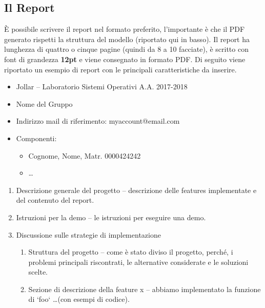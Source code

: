 \subsection{Il Report}
È possibile scrivere il report nel formato preferito, l'importante è che il PDF generato rispetti la struttura del modello (riportato qui in basso). Il report ha lunghezza di quattro o cinque pagine (quindi da 8 a 10 facciate), è scritto con font di grandezza \textbf{12pt} e viene consegnato in formato PDF. 
Di seguito viene riportato un esempio di report con le principali caratteristiche da inserire.
\begin{tcolorbox}[colback=green!20!white,colframe=green!75!black,title=L'intestazione del Report]
\begin{itemize}
    \item Jollar -- Laboratorio Sistemi Operativi A.A. 2017-2018
    \item Nome del Gruppo
    \item Indirizzo mail di riferimento: myaccount@email.com
    \item Componenti:
    \begin{itemize}
        \item Cognome, Nome, Matr. 0000424242
        \item \dots
    \end{itemize}
\end{itemize}
\end{tcolorbox}
\begin{tcolorbox}[colback=green!20!white,colframe=green!75!black,title=Il corpo del Report]
\begin{enumerate}
    \item Descrizione generale del progetto -- descrizione delle features implementate e del contenuto del report.
    \item Istruzioni per la demo -- le istruzioni per eseguire una demo.
    \item Discussione sulle strategie di implementazione 
    \begin{enumerate}
        \item Struttura del progetto -- come è stato diviso il progetto, perché, i problemi principali riscontrati, le alternative considerate e le soluzioni scelte.
        \item Sezione di descrizione della feature x -- abbiamo implementato la funzione di `foo` \dots (con esempi di codice).
    \end{enumerate}
\end{enumerate}
\end{tcolorbox}


